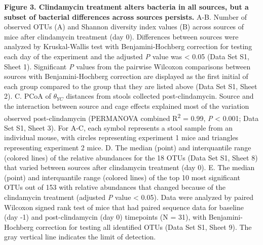 \documentclass[
  11pt,
]{article}
\begin{document}
\textbf{Figure 3. Clindamycin treatment alters bacteria in all sources,
but a subset of bacterial differences across sources persists.} A-B.
Number of observed OTUs (A) and Shannon diversity index values (B)
across sources of mice after clindamycin treatment (day 0). Differences
between sources were analyzed by Kruskal-Wallis test with
Benjamini-Hochberg correction for testing each day of the experiment and
the adjusted \emph{P} value was \textless{} 0.05 (Data Set S1, Sheet 1).
Significant \emph{P} values from the pairwise Wilcoxon comparisons
between sources with Benjamini-Hochberg correction are displayed as the
first initial of each group compared to the group that they are listed
above (Data Set S1, Sheet 2). C. PCoA of \(\theta_{YC}\) distances from
stools collected post-clindamycin. Source and the interaction between
source and cage effects explained most of the variation observed
post-clindamycin (PERMANOVA combined R\textsuperscript{2} = 0.99,
\emph{P} \textless{} 0.001; Data Set S1, Sheet 3). For A-C, each symbol
represents a stool sample from an individual mouse, with circles
representing experiment 1 mice and triangles representing experiment 2
mice. D. The median (point) and interquantile range (colored lines) of
the relative abundances for the 18 OTUs (Data Set S1, Sheet 8) that
varied between sources after clindamycin treatment (day 0). E. The
median (point) and interquantile range (colored lines) of the top 10
most significant OTUs out of 153 with relative abundances that changed
because of the clindamycin treatment (adjusted \emph{P} value
\textless{} 0.05). Data were analyzed by paired Wilcoxon signed rank
test of mice that had paired sequence data for baseline (day -1) and
post-clindamycin (day 0) timepoints (N = 31), with Benjamini-Hochberg
correction for testing all identified OTUs (Data Set S1, Sheet 9). The
gray vertical line indicates the limit of detection.

\newpage
\end{document}
